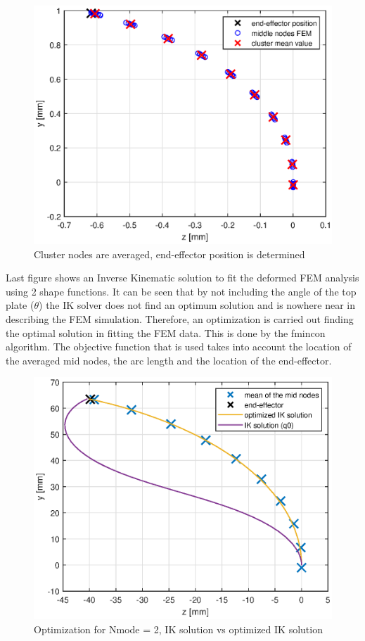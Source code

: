 \begin{figure}[H]
    \centering
    \includegraphics[width = \linewidth]{Figures/Progress/main2.eps}
    \caption{Cluster nodes are averaged, end-effector position is determined}
\end{figure}

Last figure shows an Inverse Kinematic solution to fit the deformed FEM analysis using 2 shape functions. It can be seen that by not including the angle of the top plate ($\theta$) the IK solver does not find an optimum solution and is nowhere near in describing the FEM simulation. Therefore, an optimization is carried out finding the optimal solution in fitting the FEM data. This is done by the fmincon algorithm. The objective function that is used takes into account the location of the averaged mid nodes, the arc length and the location of the end-effector.

\begin{figure}
    \centering
    \includegraphics[width = \linewidth]{Figures/Progress/main3.eps}
    \caption{Optimization for Nmode = 2, IK solution vs optimized IK solution}

\end{figure}


